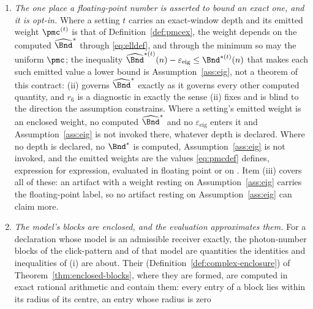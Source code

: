 \begin{theorem}
\begin{enumerate}[label=(\roman*),leftmargin=3.0em]
  the floating-point evaluation, so (ii) and (iii) apply to a weight it forms;
  what changes is that the rigorous evaluation of (vii) then encloses no
  matrix product, the enclosures it starts from being the declared Grams
  themselves. This is also why $r_1$ and $r_3$ do not exist on this route: they
  are written on a $\Gmat$ that is not supplied
  (Definition~\ref{def:residuals}). Nothing further is claimed.
\item \emph{The one place a floating-point number is asserted to bound an
  exact one, and it is opt-in.} Where a setting $t$ carries an exact-window
  depth and its emitted weight $\pmc^{(t)}$ is that of
  Definition~\ref{def:pmcex}, the weight depends on the
  computed $\widehat\Bnd^{\ast}$ through \eqref{eq:elldef}, and through the
  minimum so may the uniform $\pmc$; the inequality
  $\widehat\Bnd^{\ast(t)}(n)-\varepsilon_{\mathrm{eig}}\le\Bnd^{\ast(t)}(n)$
  that makes each such emitted value a lower bound is Assumption~\ref{ass:eig},
  not a theorem of this contract: (ii) governs $\widehat\Bnd^{\ast}$ exactly as
  it governs every other computed quantity, and $r_6$ is a diagnostic in
  exactly the sense (ii) fixes and is blind to the direction the assumption
  constrains. Where a setting's emitted weight is an enclosed weight, no
  computed $\widehat\Bnd^{\ast}$ and no $\varepsilon_{\mathrm{eig}}$ enters
  it and Assumption~\ref{ass:eig} is not invoked there, whatever depth is
  declared. Where no depth is declared, no
  $\Bnd^{\ast}$ is computed, Assumption~\ref{ass:eig} is not invoked, and the
  emitted weights are the values \eqref{eq:pmcdef} defines, expression for
  expression, evaluated in floating point or on . Item
  (iii) covers all of these: an artifact with a weight resting on
  Assumption~\ref{ass:eig} carries the floating-point label, so no artifact
  resting on Assumption~\ref{ass:eig} can claim more.
\item \emph{The model's blocks are enclosed, and the evaluation approximates
  them.} For a declaration whose model is an admissible receiver exactly, the
  photon-number blocks of the click-pattern and
   of that model are quantities the
  identities and inequalities of (i) are about. Their
  (Definition~\ref{def:complex-enclosure}) of
  Theorem~\ref{thm:enclosed-blocks}, where they are formed, are computed in
  exact rational arithmetic and contain them: every entry of a
  block lies within its radius of its centre, an entry whose radius is zero

\end{enumerate}
\end{theorem}
